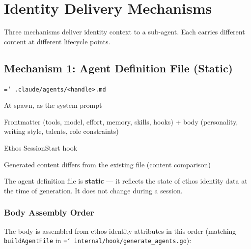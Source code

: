 \documentclass[a4paper,10pt]{article}
\newcommand{\fpath}[1]{\texttt{\hyphenchar\font=`\/ #1}}
\newcommand{\cmd}[1]{\texttt{#1}}
\begin{document}
\section{Identity Delivery Mechanisms}
\label{sec:delivery}

Three mechanisms deliver identity context to a sub-agent. Each
carries different content at different lifecycle points.

\subsection{Mechanism 1: Agent Definition File (Static)}

\begin{description}[style=nextline]
  \item[File] \fpath{.claude/agents/<handle>.md}
  \item[Loaded] At spawn, as the system prompt
  \item[Content] Frontmatter (tools, model, effort, memory, skills,
    hooks) + body (personality, writing style, talents, role
    constraints)
  \item[Generated by] Ethos SessionStart hook
  \item[Regenerated when] Generated content differs from the
    existing file (content comparison)
\end{description}

The agent definition file is \textbf{static} --- it reflects the
state of ethos identity data at the time of generation. It does not
change during a session.

\subsubsection{Body Assembly Order}

The body is assembled from ethos identity attributes in this order
(matching \cmd{buildAgentFile} in
\fpath{internal/hook/generate\_agents.go}):
\end{document}
